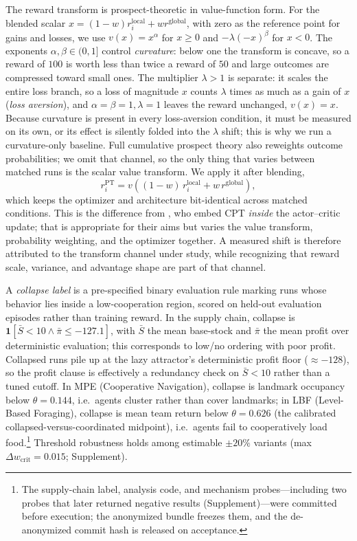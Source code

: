 \documentclass[letterpaper]{article} %
\theoremstyle{plain}
\newcommand{\wcrit}{w_{\mathrm{crit}}}
\newcommand{\PT}{\mathrm{PT}}
\begin{document}
The reward transform is prospect-theoretic in value-function form. For the blended scalar
$x=(1-w)r_i^{\mathrm{local}}+w r^{\mathrm{global}}$, with zero as the reference point for gains
and losses, we use $v(x)=x^\alpha$ for $x\ge0$ and $-\lambda(-x)^\beta$ for $x<0$. The exponents
$\alpha,\beta\in(0,1]$ control \emph{curvature}: below one the transform is concave, so a reward of
$100$ is worth less than twice a reward of $50$ and large outcomes are compressed toward small ones.
The multiplier $\lambda>1$ is separate: it scales the entire loss branch, so a loss of magnitude
$x$ counts $\lambda$ times as much as a gain of $x$ (\emph{loss aversion}), and
$\alpha{=}\beta{=}1,\lambda{=}1$ leaves the reward unchanged, $v(x)=x$. Because curvature is present
in every loss-aversion condition, it must be measured on its own, or its effect is silently folded
into the $\lambda$ shift; this is why we run a curvature-only baseline. Full cumulative prospect
theory also reweights outcome probabilities; we omit that channel, so the only thing that varies
between matched runs is the scalar value transform. We apply it after blending,
\begin{equation}
 r_i^{\PT}=v\!\left((1-w)\,r_i^{\mathrm{local}}+w\,r^{\mathrm{global}}\right),
 \label{eq:reward}
\end{equation}
which keeps the optimizer and architecture bit-identical across matched conditions. This is the
difference from \citet{lalmohammed2025}, who embed CPT \emph{inside} the actor--critic update; that
is appropriate for their aims but varies the value transform, probability weighting, and the
optimizer together. A measured shift is therefore attributed to the transform channel under study,
while recognizing that reward scale, variance, and advantage shape are part of that channel.

A \emph{collapse label} is a pre-specified binary evaluation rule marking runs whose behavior lies
inside a low-cooperation region, scored on held-out evaluation episodes rather than training reward.
In the supply chain, collapse is $\mathbf{1}[\bar S<10\wedge\bar\pi\le-127.1]$, with $\bar S$ the
mean base-stock and $\bar\pi$ the mean profit over deterministic evaluation; this corresponds to
low/no ordering with poor profit. Collapsed runs pile up at the lazy attractor's deterministic
profit floor ($\approx-128$), so the profit clause is effectively a redundancy check on
$\bar S<10$ rather than a tuned cutoff. In MPE (Cooperative Navigation), collapse is landmark
occupancy below $\theta=0.144$, i.e.\ agents cluster rather than cover landmarks; in LBF
(Level-Based Foraging), collapse is mean team return below $\theta=0.626$ (the calibrated
collapsed-versus-coordinated midpoint), i.e.\ agents fail to cooperatively load food.\footnote{The supply-chain
label, analysis code, and mechanism probes---including two probes that later returned negative
results (Supplement)---were committed before execution; the anonymized bundle freezes them, and the
de-anonymized commit hash is released on acceptance.} Threshold robustness holds among estimable
$\pm20\%$ variants (max $\Delta\wcrit=0.015$; Supplement).
\end{document}
